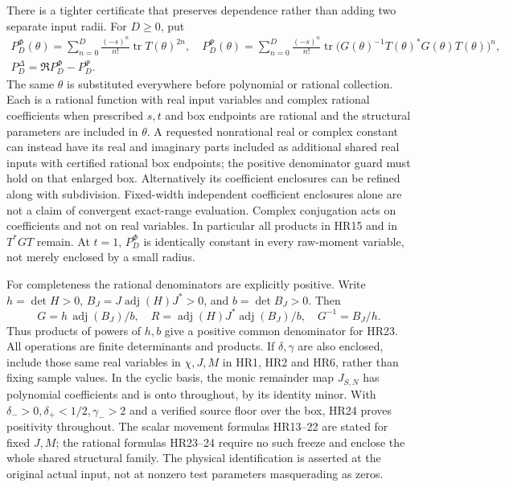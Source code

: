 \documentclass[11pt]{article}
\newcommand{\tr}{\operatorname{tr}}\newcommand{\dd}{\dagger_G}
\begin{document}
There is a tighter certificate that preserves dependence rather than
adding two separate input radii. For \(D\ge0\), put
\begin{equation}\tag{HR23}\label{HR23}
\begin{gathered}
P_D^\Phi(\theta)=\sum_{n=0}^D\frac{(-s)^n}{n!}\tr T(\theta)^{2n},\quad
P_D^\Psi(\theta)=\sum_{n=0}^D\frac{(-s)^n}{n!}
\tr\bigl(G(\theta)^{-1}T(\theta)^*G(\theta)T(\theta)\bigr)^n,\\
P_D^\Delta=\Re P_D^\Phi-P_D^\Psi.
\end{gathered}
\end{equation}
The same \(\theta\) is substituted everywhere before polynomial or
rational collection. Each is a rational function with real input
variables and complex rational coefficients when prescribed
\(s,t\) and box endpoints are rational and the structural parameters
are included in \(\theta\). A requested nonrational real or complex
constant can instead have its real and imaginary parts included as
additional shared real inputs with certified rational box endpoints;
the positive denominator guard must hold on that enlarged box.
Alternatively its coefficient enclosures can be refined along with
subdivision. Fixed-width independent coefficient enclosures alone are
not a claim of convergent exact-range evaluation. Complex conjugation acts on
coefficients and not on real variables. In particular all products
in HR15 and in \(T^*GT\) remain. At \(t=1\), \(P_D^\Phi\) is
identically constant in every raw-moment variable, not merely enclosed
by a small radius.

For completeness the rational denominators are explicitly positive.
Write \(h=\det H>0\), \(B_J=J\operatorname{adj}(H)J^*>0\), and
\(b=\det B_J>0\). Then
\begin{equation}\tag{HR24}\label{HR24}
G=h\,\operatorname{adj}(B_J)/b,\quad
R=\operatorname{adj}(H)J^*\operatorname{adj}(B_J)/b,\quad
G^{-1}=B_J/h.
\end{equation}
Thus products of powers of \(h,b\) give a positive common denominator
for HR23. All operations are finite determinants and products.
If \(\delta,\gamma\) are also enclosed, include those same real
variables in \(\chi,J,M\) in HR1, HR2 and HR6, rather than fixing
sample values. In the cyclic basis, the monic remainder map \(J_{S,N}\)
has polynomial coefficients and is onto throughout, by its identity
minor. With \(\delta_->0,\delta_+<1/2,\gamma_->2\) and a verified
source floor over the box, HR24 proves positivity throughout.
The scalar movement formulas HR13--22 are stated for fixed \(J,M\);
the rational formulas HR23--24 require no such freeze and enclose the
whole shared structural family. The physical identification is asserted
at the original actual input, not at nonzero test parameters masquerading
as zeros.
\end{document}
